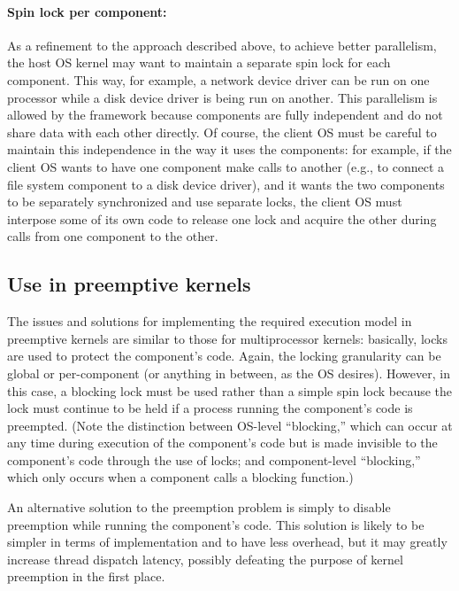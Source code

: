 \paragraph{Spin lock per component:}
As a refinement to the approach described above,
to achieve better parallelism,
the host OS kernel may want to maintain
a separate spin lock for each component.
This way, for example,
a network device driver can be run on one processor
while a disk device driver is being run on another.
This parallelism is allowed by the framework
because components are fully independent
and do not share data with each other directly.
Of course, the client OS must be careful to maintain this independence
in the way it uses the components:
for example, if the client OS wants to have one component make calls to another
(e.g., to connect a file system component to a disk device driver),
and it wants the two components
to be separately synchronized and use separate locks,
the client OS must interpose some of its own code
to release one lock and acquire the other
during calls from one component to the other.

\subsection{Use in preemptive kernels}
\label{fdev-in-preemptive}

The issues and solutions for implementing the required execution model
in preemptive kernels are similar to those for multiprocessor kernels:
basically, locks are used to protect the component's code.
Again, the locking granularity can be global or per-component
(or anything in between, as the OS desires).
However, in this case,
a blocking lock must be used rather than a simple spin lock
because the lock must continue to be held
if a process running the component's code is preempted.
(Note the distinction between OS-level ``blocking,''
which can occur at any time during execution of the component's code
but is made invisible to the component's code through the use of locks;
and component-level ``blocking,''
which only occurs when a component calls a blocking function.)

An alternative solution to the preemption problem
is simply to disable preemption while running the component's code.
This solution is likely to be simpler in terms of implementation
and to have less overhead,
but it may greatly increase thread dispatch latency,
possibly defeating the purpose of kernel preemption in the first place.

